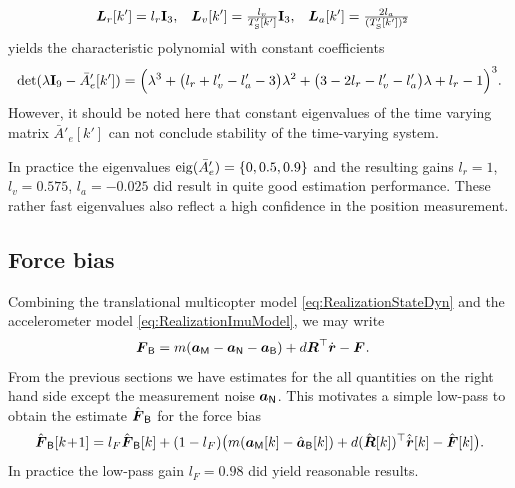 \begin{align}
 \mat{L}_r[k'] &= l_r \idMat[3],& 
 \mat{L}_v[k'] &= \tfrac{l_v}{\Tsp[k']} \idMat[3],&
 \mat{L}_a[k'] &= \tfrac{2 l_a}{(\Tsp[k'])^2}
\end{align}
yields the characteristic polynomial with constant coefficients
\begin{align}
 \det(\lambda \idMat[9] - \bar{A}'_e[k'])
 = \Big( \lambda^3
  + \big(l_r + l'_v - l'_a - 3 \big) \lambda^2
  + \big(3 - 2 l_r - l'_v - l'_a \big) \lambda
  + l_r - 1
 \Big)^3.
\end{align}
However, it should be noted here that constant eigenvalues of the time varying matrix $\bar{A}'_e[k']$ can not conclude stability of the time-varying system.

In practice the eigenvalues $\eig(\bar{A}'_e) = \{ 0, 0.5, 0.9 \}$ and the resulting gains $l_r = 1$, $l_v = 0.575$, $l_a = -0.025$ did result in quite good estimation performance.
These rather fast eigenvalues also reflect a high confidence in the position measurement.


\subsection{Force bias}
Combining the translational multicopter model \eqref{eq:RealizationStateDyn} and the accelerometer model \eqref{eq:RealizationImuModel}, we may write
\begin{align}
 \FB &= m (\aIMU - \aIMUN - \aIMUB) + d \RT \rd - \bodyForce{}{}.
\end{align}
From the previous sections we have estimates for the all quantities on the right hand side except the measurement noise $\aIMUN$.
This motivates a simple low-pass to obtain the estimate $\FBObs$ for the force bias
\begin{align}
 \FBObs[\kPlusOne] = l_F \FBObs[k] + (1 - l_F) \big( m (\aIMU[k] - \aIMUBObs[k]) + d (\RObs[k])^\top \rdObs[k] - \FObs[k] \big)
 .
\end{align}
In practice the low-pass gain $l_F = 0.98$ did yield reasonable results.

